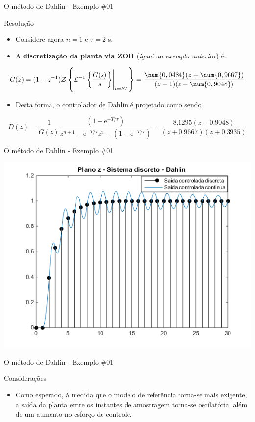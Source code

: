 \begin{frame}{O método de Dahlin - Exemplo \#01}
\begin{block}{Resolução}
\begin{itemize}
    \item Considere agora $n=1$ e $\tau = 2$ s.
    \item A \textbf{discretização da planta via ZOH} (\textit{igual ao exemplo anterior}) é:
\end{itemize}
$$G(z)=(1-z^{-1})\mathcal{Z}\left\lbrace \mathcal{L}^{-1}\eval{\left\lbrace \dfrac{G(s)}{s}\right\rbrace}_{t=kT} \right\rbrace =\dfrac{\num{0,0484}(z+\num{0,9667})}{(z-1)(z-\num{0,9048})}$$
\begin{itemize}
    \item Desta forma, o controlador de Dahlin é projetado como sendo
\end{itemize}
$$D(z) = \dfrac{1}{G(z)} \dfrac{(1-\text{e}^{-T/\tau})}{z^{n+1}-\text{e}^{-T/\tau}z^n - (1-\text{e}^{-T/\tau})} = \dfrac{\num{8,1295}(z-\num{0,9048})}{(z+\num{0,9667})(z+\num{0,3935})}$$
\end{block}
\end{frame}

\begin{frame}{O método de Dahlin - Exemplo \#01}
\centerline{\includegraphics[width=0.8\linewidth]{Figuras/Ch12/fig9.png}}
\end{frame}

\begin{frame}{O método de Dahlin - Exemplo \#01}
\begin{block}{Considerações}
\begin{itemize}
    \item Como esperado, à medida que o modelo de referência torna-se mais exigente, a saída da  planta entre os instantes de amostragem torna-se oscilatória, além de um aumento no esforço de controle.
\end{itemize}
\end{block}
\end{frame}


